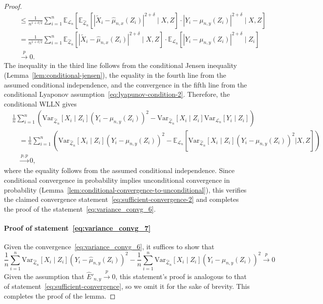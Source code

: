 \documentclass[aos]{imsart}
\theoremstyle{plain}
\theoremstyle{remark}
\newcommand{\E}{\mathbb E}								%
\newcommand{\V}{\mathrm{Var}}							%
\newcommand{\convp}{\overset p \rightarrow}             %
\newcommand{\srx}{X}									%
\newcommand{\srz}{Z}									%
\newcommand{\srxk}{\widetilde X}						%
\newcommand{\sry}{Y}									%
\newcommand{\law}{\mathcal L}							%
\newcommand{\lawhat}{\widehat{\mathcal L}}				%
\newcommand{\convpp}{\overset {p,p} \longrightarrow}    %
\begin{document}
\begin{proof}
\begin{align*}
		&\quad\leq \frac{1}{n^{1+\delta/2}} \sum_{i = 1}^n \E_{\law_n}\left[\E_{\lawhat_n}[|\srxk_i-\widehat{\mu}_{n,x}(Z_i)|^{2+\delta} \mid \srx, \srz] \cdot |\sry_i-\mu_{n,y}(Z_i)|^{2+\delta} \mid \srx,\srz\right]\\
		&\quad= \frac{1}{n^{1+\delta/2}} \sum_{i = 1}^n \E_{\lawhat_n}[|\srxk_i-\widehat\mu_{n,x}(Z_i)|^{2+\delta}\mid \srx, \srz] \cdot \E_{\law_n}\left[|\sry_i-\mu_{n,y}(Z_i)|^{2+\delta} \mid Z_i\right]\\
		&\quad\convp 0. 
	\end{align*}
	The inequality in the third line follows from the conditional Jensen inequality (Lemma~\ref{lem:conditional-jensen}), the equality in the fourth line from the assumed conditional independence, and the convergence in the fifth line from the conditional Lyaponov assumption~\eqref{eq:lyapunov-condition-2}. Therefore, the conditional WLLN gives
	\begin{equation*}
		\begin{split}
			&\frac{1}{n} \sum_{i=1}^n \left(\V_{\lawhat_n}[\srx_i\mid \srz_i](\sry_i-\mu_{n,y}(\srz_i))^2- \V_{\lawhat_n}[\srx_i\mid \srz_i]\V_{\law_n}[\sry_i \mid \srz_i]\right) \\
			&\quad = \frac{1}{n} \sum_{i=1}^n \left(\V_{\lawhat_n}[\srx_i\mid \srz_i](\sry_i-\mu_{n,y}(\srz_i))^2- \E_{\law_n}[\V_{\lawhat_n}[\srx_i\mid \srz_i](\sry_i-\mu_{n,y}(\srz_i))^2 | \srx, \srz]\right) \\
			&\quad \convpp 0,
		\end{split}
	\end{equation*}
	where the equality follows from the assumed conditional independence. Since conditional convergence in probability implies unconditional convergence in probability (Lemma~\ref{lem:conditional-convergence-to-unconditional}), this verifies the claimed convergence statement~\eqref{eq:sufficient-convergence-2} and completes the proof of the statement~\eqref{eq:variance_convg_6}.
	
	\paragraph*{Proof of statement~\eqref{eq:variance_convg_7}} 
	
	Given the convergence~\eqref{eq:variance_convg_6}, it suffices to show that
	\begin{equation}
		\frac{1}{n}\sum_{i=1}^n \V_{\lawhat_n}[\srx_i\mid \srz_i](\sry_i-\widehat \mu_{n,y}(\srz_i))^2-\frac{1}{n}\sum_{i=1}^n \V_{\lawhat_n}[\srx_i\mid \srz_i](\sry_i-\mu_{n,y}(\srz_i))^2
		\convp 0
	\end{equation}
	Given the assumption that $\widehat E'_{n,y} \convp 0$, this statement's proof is analogous to that of statement~\eqref{eq:sufficient-convergence}, so we omit it for the sake of brevity. This completes the proof of the lemma.
\end{proof}
\end{document}
